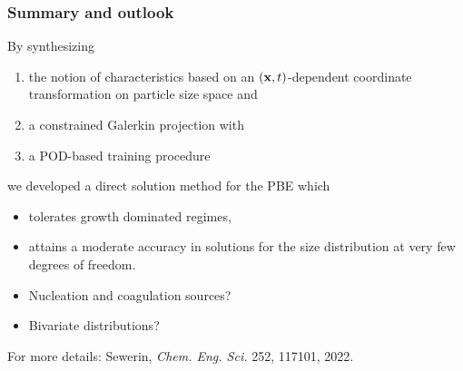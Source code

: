 \documentclass[10pt,xcolor=dvipsnames]{beamer}
\newcommand*{\itemskip}{0.25\baselineskip}
\begin{document}
\begin{frame}[t]
\end{frame}


\begin{frame}[t]
  
  \frametitle{Summary and outlook}
  
  \justifying By synthesizing
  \begin{enumerate}
  \vspace{\itemskip}
  \item the notion of characteristics based on an $({\mathbf x}, t)$-dependent coordinate transformation on particle size space and
  \vspace{\itemskip}
  \item a constrained Galerkin projection with 
  \vspace{\itemskip}
  \item a POD-based training procedure
  \vspace{\itemskip}
  \end{enumerate} 
  
  we developed a direct solution method for the PBE which
  
  \begin{itemize}
  \vspace{\itemskip}
  \item tolerates growth dominated regimes,
  \vspace{\itemskip}
  \item attains a moderate accuracy in solutions for the size distribution at very few degrees of freedom.
  \end{itemize}
  \vspace{0.5\baselineskip}
  
  \begin{itemize}
  \vspace{\itemskip}
  \item Nucleation and coagulation sources?
  \vspace{\itemskip}
  \item Bivariate distributions?
  \end{itemize}
  \vspace{0.5\baselineskip}
  
  \justifying For more details: Sewerin, \textit{Chem. Eng. Sci.} 252, 117101, 2022.
  
\end{frame}
\end{document}
